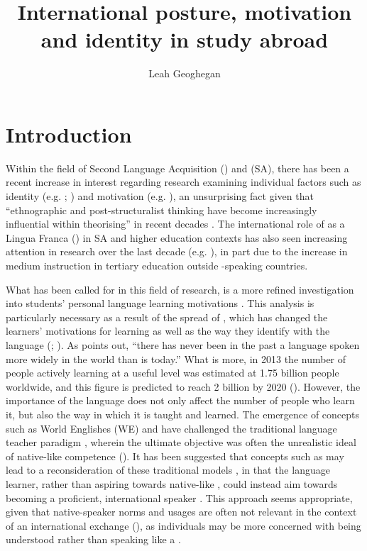 \documentclass[output=paper]{langsci/langscibook}
\author{Leah Geoghegan\affiliation{Portsmouth University}}
\title{International posture, motivation and identity in study abroad}
\begin{document}
  



\section{Introduction}

Within the field of Second Language Acquisition () and  (SA), there has been a recent increase in interest regarding research examining individual factors such as identity (e.g. \citeauthor{Jackson2008b} \citeyear*{Jackson2008b}; \citealt{Kinginger2013,Brown2013}) and motivation (e.g. \citealt{Isabelli-García2006,Allen2010,Hernández2010,Sasaki2011,IrieRyan2014}), an unsurprising fact given that “ethnographic and {post-structuralist} thinking have become increasingly influential within  theorising” in recent decades \citep[8]{MitchellEtAl2015}. The international role of  as a Lingua Franca () in SA and higher education contexts has also seen increasing attention in research over the last decade (e.g. \citealt{Smit2010,Jenkins2011,Coleman2015}), in part due to the increase in  medium instruction in tertiary education outside -speaking countries. 

What has been called for in this field of research, is a more refined investigation into students’ personal language learning motivations \citep{MitchellEtAl2015}. This analysis is particularly necessary as a result of the spread of , which has changed the learners’ motivations for learning as well as the way they identify with the language (\citealt{JenkinsEtAl2011}; \citealt{Isabelli-García2006}). As \citet[2]{Melitz2016} points out, “there has never been in the past a language spoken more widely in the world than  is today.” What is more, in 2013 the number of people actively learning  at a useful level was estimated at 1.75 billion people worldwide, and this figure is predicted to reach 2 billion by 2020 (\citealt{BritishCouncil2013}). However, the importance of the language does not only affect the number of people who learn it, but also the way in which it is taught and learned. The emergence of concepts such as World Englishes (WE) and  have challenged the traditional  language teacher paradigm \citep{Pakir2009}, wherein the ultimate objective was often the unrealistic ideal of native-like competence (\citealt{KeCahyani2014}). It has been suggested that concepts such as  may lead to a reconsideration of these traditional  models \citep{Seidlhofer2001}, in that the language learner, rather than aspiring towards native-like , could instead aim towards becoming a proficient, international  speaker \citep{Majanen2008}. This approach seems appropriate, given that native-speaker norms and usages are often not relevant in the context of an international  exchange (\citealt{KeCahyani2014}), as individuals may be more concerned with being understood rather than speaking like a . 
\end{document}
